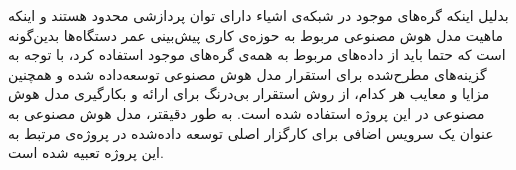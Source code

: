 بدلیل اینکه گره‌های موجود در شبکه‌ی اشیاء دارای توان پردازشی محدود هستند و اینکه ماهیت مدل هوش‌ مصنوعی مربوط به حوزه‌ی کاری پیش‌بینی عمر دستگاه‌ها بدین‌گونه است که حتما باید از داده‌های مربوط به همه‌ی گره‌های موجود استفاده کرد، با توجه به گزینه‌های مطرح‌شده برای استقرار مدل هوش مصنوعی توسعه‌داده شده و همچنین مزایا و معایب هر کدام، از روش استقرار بی‌درنگ برای ارائه و بکارگیری مدل هوش مصنوعی در این پروژه استفاده شده است. به طور دقیقتر، مدل هوش مصنوعی به عنوان یک سرویس اضافی برای کارگزار اصلی توسعه‌ داده‌شده در پروژه‌ی مرتبط 
به این پروژه تعبیه شده است. 

